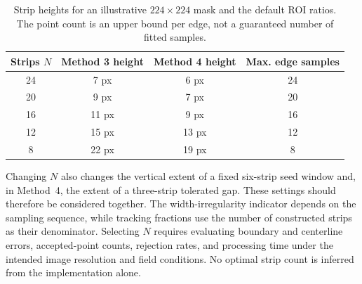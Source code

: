 \begin{table}[htbp]
    \centering
    \small
    \caption{Strip heights for an illustrative $224\times224$ mask and
    the default ROI ratios. The point count is an upper bound per edge,
    not a guaranteed number of fitted samples.}
    \label{tab:c4_strip_tradeoff}
    \begin{tabular}{@{}c c c c@{}}
        \toprule
        Strips $N$ & Method 3 height & Method 4 height & Max. edge samples \\
        \midrule
        24 & 7 px & 6 px & 24 \\
        20 & 9 px & 7 px & 20 \\
        16 & 11 px & 9 px & 16 \\
        12 & 15 px & 13 px & 12 \\
        8 & 22 px & 19 px & 8 \\
        \bottomrule
    \end{tabular}
\end{table}

Changing $N$ also changes the vertical extent of a fixed six-strip seed
window and, in Method~4, the extent of a three-strip tolerated gap. These
settings should therefore be considered together. The width-irregularity
indicator depends on the sampling sequence, while tracking fractions
use the number of constructed strips as their denominator. Selecting
$N$ requires evaluating boundary and centerline errors, accepted-point
counts, rejection rates, and processing time under the intended image
resolution and field conditions. No optimal strip count is inferred from
the implementation alone.